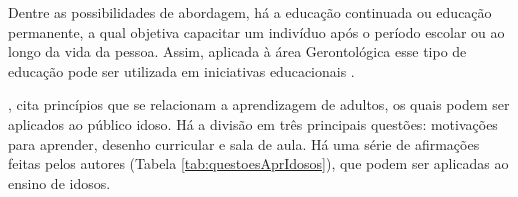 Dentre as possibilidades de abordagem, há a educação continuada ou educação permanente, a qual objetiva capacitar um indivíduo após o período escolar ou ao longo da vida da pessoa. Assim, aplicada à área Gerontológica esse tipo de educação pode ser utilizada em iniciativas educacionais \citep{neri2001palavras}. 


\cite{zemke198430}, cita princípios que se relacionam a aprendizagem de adultos, os quais podem ser aplicados ao público idoso. Há a divisão em três principais questões: motivações para aprender, desenho curricular e sala de aula. Há uma série de afirmações feitas pelos autores (Tabela \ref{tab:questoesAprIdosos}), que podem ser aplicadas ao ensino de idosos.

